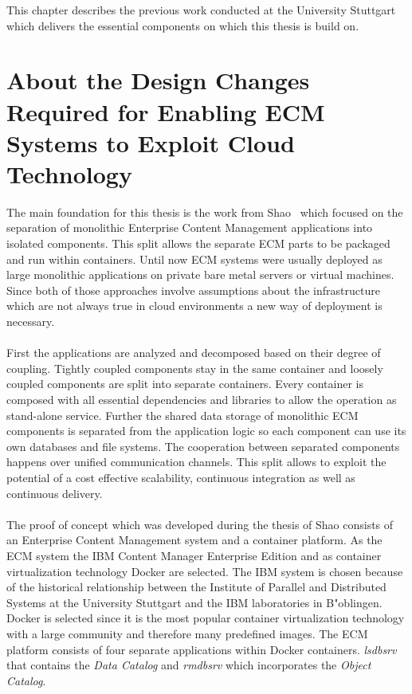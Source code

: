 This chapter describes the previous work conducted at the University Stuttgart which delivers the essential components on which this thesis is build on.

\section{About the Design Changes Required for Enabling ECM Systems to Exploit Cloud Technology}
The main foundation for this thesis is the work from Shao~\cite{shao} which focused on the separation of monolithic Enterprise Content Management applications into isolated components. 
This split allows the separate ECM parts to be packaged and run within containers.
Until now ECM systems were usually deployed as large monolithic applications on private bare metal servers or virtual machines.
Since both of those approaches involve assumptions about the infrastructure which are not always true in cloud environments a new way of deployment is necessary.
\\
\\
First the applications are analyzed and decomposed based on their degree of coupling.
Tightly coupled components stay in the same container and loosely coupled components are split into separate containers.
Every container is composed with all essential dependencies and libraries to allow the operation as stand-alone service.
Further the shared data storage of monolithic ECM components is separated from the application logic so each component can use its own databases and file systems.
The cooperation between separated components happens over unified communication channels.
This split allows to exploit the potential of a cost effective scalability, continuous integration as well as continuous delivery.
\\
\\
The proof of concept which was developed during the thesis of Shao consists of an Enterprise Content Management system and a container platform.
As the ECM system the IBM Content Manager Enterprise Edition and as container virtualization technology Docker are selected.
The IBM system is chosen because of the historical relationship between the Institute of Parallel and Distributed Systems at the University Stuttgart and the IBM laboratories in B"oblingen.
Docker is selected since it is the most popular container virtualization technology with a large community and therefore many predefined images.
The ECM platform consists of four separate applications within Docker containers.
\textit{lsdbsrv} that contains the \textit{Data Catalog} and \textit{rmdbsrv} which incorporates the \textit{Object Catalog}.
